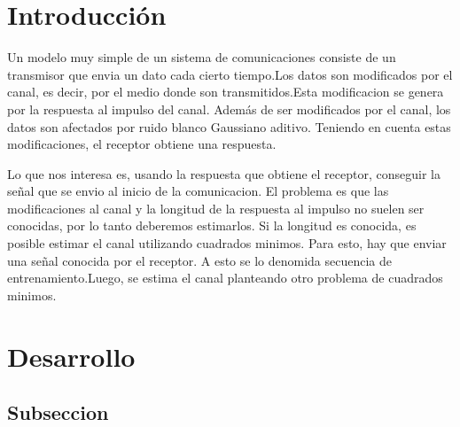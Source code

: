 \documentclass{article}
\begin{document}
\begin{multicols}{2}

\section{Introducción}


\par Un modelo muy simple de un sistema de comunicaciones consiste de un transmisor que envia un dato cada cierto tiempo.Los datos son modificados por el canal, es decir, por el medio donde son transmitidos.Esta modificacion se genera por la respuesta al impulso del
canal. Además de ser modificados por el canal, los datos son afectados por ruido blanco Gaussiano aditivo. Teniendo en cuenta estas modificaciones, el receptor obtiene una respuesta.\\
\par Lo que nos interesa es, usando la respuesta que obtiene el receptor, conseguir la señal que se envio al inicio de la comunicacion. El problema es que las modificaciones al canal y la longitud de la respuesta al impulso no suelen ser conocidas, por lo tanto deberemos estimarlos. 
Si la longitud es conocida, es posible estimar el canal utilizando cuadrados minimos. Para esto, hay que enviar una señal conocida por el receptor. A esto se lo denomida secuencia de entrenamiento.Luego, se estima el canal planteando otro problema de cuadrados minimos. 



\section{Desarrollo}
\subsection{Subseccion}
\label{sec1}



\end{multicols}
\end{document}
